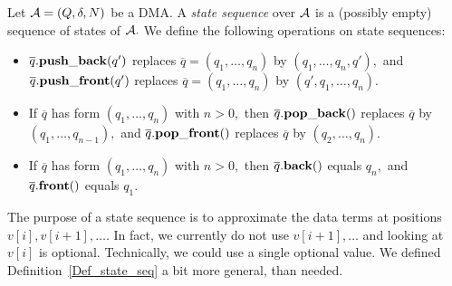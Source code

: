 \begin{definition}
   \label{Def_state_seq}
   Let $ {\cal A} = ( Q, \delta, N ) $ be a DMA.
   A \emph{state sequence} over $ {\cal A} $ is a
   (possibly empty) sequence of states of $ {\cal A}. $
   We define the following operations on state sequences:
   \begin{itemize}
   \item
      $ \overline{q}. {\bf push\_back}(q') $ replaces
      $ \overline{q} = (q_1, \ldots, q_n ) $ by
      $ (q_1, \ldots, q_n, q' ), $ and
      $ \overline{q}. {\bf push\_front}(q') $ replaces
      $ \overline{q} = (q_1, \ldots, q_n) $ by
      $ ( q', q_1, \ldots, q_n ). $
   \item
      If $ \overline{q} $ has form $ ( q_1, \ldots, q_n ) $ with $ n > 0, $
      then $ \overline{q}. {\bf pop\_back}( ) $ replaces
      $ \overline{q} $ by $ ( q_1, \ldots, q_{n-1} ), $
      and $ \overline{q}. {\bf pop\_front}( ) $ replaces
      $ \overline{q} $ by $ ( q_2, \ldots, q_n ). $
   \item
      If $ \overline{q} $ has form $ ( q_1, \ldots, q_n ) $ with $ n > 0, $
      then $ \overline{q}. {\bf back}( ) $ equals $ q_n, $
      and $ \overline{q}. {\bf front}( ) $ equals $ q_1. $
   \end{itemize}
\end{definition}
The purpose of a state sequence is to approximate the
data terms at positions $ v[i], v[i+1], \ldots. $ 
In fact, we currently do not use $ v[i+1], \ldots $ and looking at
$ v[i] $ is optional. Technically, we could use a 
single optional value. We defined Definition~\ref{Def_state_seq} a bit
more general, than needed. 

